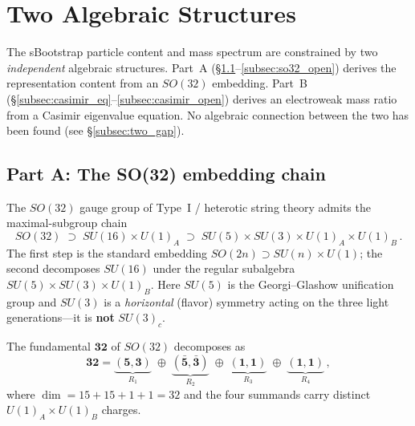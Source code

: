 \documentclass[12pt,a4paper]{article}
\begin{document}
\section{Two Algebraic Structures}
\label{sec:two_structures}

The sBootstrap particle content and mass spectrum are constrained by
two \emph{independent} algebraic structures.  Part~A
(\S\ref{subsec:so32_chain}--\ref{subsec:so32_open}) derives the
representation content from an $SO(32)$ embedding.  Part~B
(\S\ref{subsec:casimir_eq}--\ref{subsec:casimir_open}) derives an
electroweak mass ratio from a Casimir eigenvalue equation.
No algebraic connection between the two has been found
(see \S\ref{subsec:two_gap}).

\subsection{Part A: The SO(32) embedding chain}
\label{subsec:so32_chain}

The $SO(32)$ gauge group of Type~I / heterotic string theory
admits the maximal-subgroup chain
\begin{equation}
\label{eq:so32_chain}
SO(32) \;\supset\; SU(16) \times U(1)_A
  \;\supset\; SU(5) \times SU(3) \times U(1)_A \times U(1)_B \,.
\end{equation}
The first step is the standard embedding $SO(2n) \supset SU(n)
\times U(1)$; the second decomposes $SU(16)$ under the regular
subalgebra $SU(5) \times SU(3) \times U(1)_B$.
Here $SU(5)$ is the Georgi--Glashow unification group and $SU(3)$
is a \emph{horizontal} (flavor) symmetry acting on the three
light generations---it is \textbf{not} $SU(3)_c$.

The fundamental $\mathbf{32}$ of $SO(32)$ decomposes as
\begin{equation}
\label{eq:32decomp}
\mathbf{32} = \underbrace{(\mathbf{5},\mathbf{3})}_{R_1}
  \;\oplus\; \underbrace{(\bar{\mathbf{5}},\bar{\mathbf{3}})}_{R_2}
  \;\oplus\; \underbrace{(\mathbf{1},\mathbf{1})}_{R_3}
  \;\oplus\; \underbrace{(\mathbf{1},\mathbf{1})}_{R_4}\,,
\end{equation}
where $\dim = 15 + 15 + 1 + 1 = 32$ and the four summands carry
distinct $U(1)_A \times U(1)_B$ charges.
\end{document}
